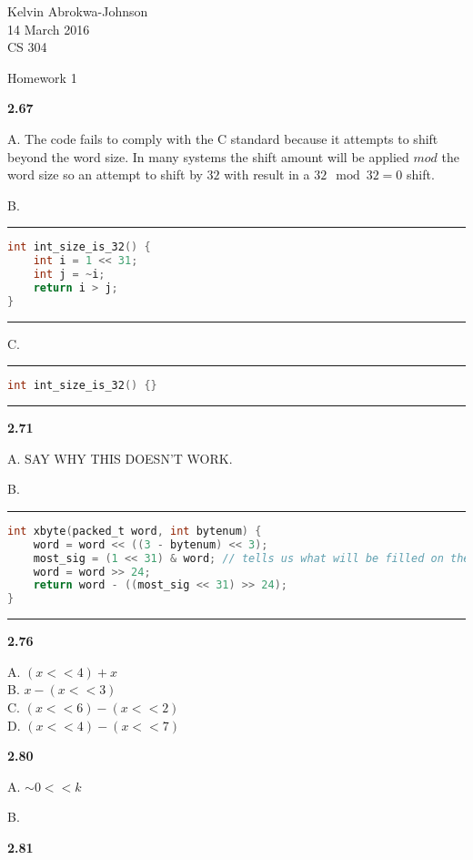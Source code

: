 \documentclass[11pt]{article} %
\begin{document}
 

\noindent Kelvin Abrokwa-Johnson \\
14 March 2016 \\
CS 304

\begin{center} Homework 1 \end{center}


{\bf 2.67}

A. The code fails to comply with the C standard because it attempts to shift beyond the word size. In many systems the shift amount will be applied $mod$ the word size so an attempt to shift by $32$ with result in a $32 \mod 32 = 0$ shift.

B. \\
\noindent\rule{12cm}{0.4pt}
\begin{lstlisting}[language=C]
int int_size_is_32() {
	int i = 1 << 31;
	int j = ~i;
	return i > j;
}
\end{lstlisting}
\noindent\rule{12cm}{0.4pt}


C. \\
\noindent\rule{12cm}{0.4pt}
\begin{lstlisting}[language=C]
int int_size_is_32() {}
\end{lstlisting}
\noindent\rule{12cm}{0.4pt}

\vspace{0.5in}
{\bf 2.71}

A. SAY WHY THIS DOESN'T WORK.

B. \\
\noindent\rule{12cm}{0.4pt}
\begin{lstlisting}[language=C]
int xbyte(packed_t word, int bytenum) {
	word = word << ((3 - bytenum) << 3);
	most_sig = (1 << 31) & word; // tells us what will be filled on the next right shift
	word = word >> 24;
	return word - ((most_sig << 31) >> 24);
}
\end{lstlisting}
\noindent\rule{12cm}{0.4pt}

\vspace{0.5in}
{\bf 2.76}

A. $(x << 4) + x$ \\
B. $x - (x << 3)$ \\
C. $(x << 6) - (x << 2)$ \\
D. $(x << 4) - (x << 7)$

\pagebreak
{\bf 2.80}

A. $ \sim 0 << k$

B. 

\vspace{0.5in}
{\bf 2.81}
\end{document}
